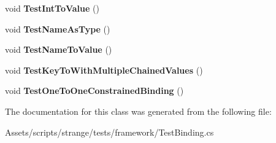 \begin{DoxyCompactItemize}
\item 
\hypertarget{classstrange_1_1unittests_1_1_test_binding_a004828298da3c3a0fc6c0f3369bc5685}{void {\bfseries Test\-Int\-To\-Value} ()}\label{classstrange_1_1unittests_1_1_test_binding_a004828298da3c3a0fc6c0f3369bc5685}

\item 
\hypertarget{classstrange_1_1unittests_1_1_test_binding_afce96220e83099d487ff3543a1cdbba4}{void {\bfseries Test\-Name\-As\-Type} ()}\label{classstrange_1_1unittests_1_1_test_binding_afce96220e83099d487ff3543a1cdbba4}

\item 
\hypertarget{classstrange_1_1unittests_1_1_test_binding_a48a919eedf8f7b751302e9b23d9541b7}{void {\bfseries Test\-Name\-To\-Value} ()}\label{classstrange_1_1unittests_1_1_test_binding_a48a919eedf8f7b751302e9b23d9541b7}

\item 
\hypertarget{classstrange_1_1unittests_1_1_test_binding_a874dce608ae61bc7157d9a9a48ad9c5a}{void {\bfseries Test\-Key\-To\-With\-Multiple\-Chained\-Values} ()}\label{classstrange_1_1unittests_1_1_test_binding_a874dce608ae61bc7157d9a9a48ad9c5a}

\item 
\hypertarget{classstrange_1_1unittests_1_1_test_binding_a7fb617562e2c66adb0bb7d8b944ea077}{void {\bfseries Test\-One\-To\-One\-Constrained\-Binding} ()}\label{classstrange_1_1unittests_1_1_test_binding_a7fb617562e2c66adb0bb7d8b944ea077}

\end{DoxyCompactItemize}


The documentation for this class was generated from the following file\-:\begin{DoxyCompactItemize}
\item 
Assets/scripts/strange/tests/framework/Test\-Binding.\-cs\end{DoxyCompactItemize}
